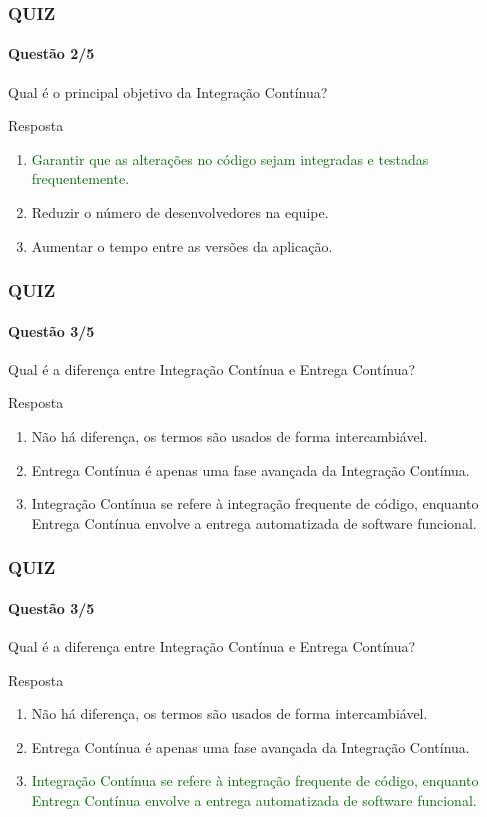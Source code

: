 \documentclass[
	9pt, %
	t, %
]{beamer}
\begin{document}
\begin{frame}
	\frametitle{QUIZ}
	\framesubtitle{Questão 2/5}

	{\Large Qual é o principal objetivo da Integração Contínua?}

	\begin{exampleblock}{Resposta}
		\begin{enumerate}[a]
			\item \textcolor{darkgreen}{Garantir que as alterações no código sejam integradas e testadas frequentemente.}
			\item Reduzir o número de desenvolvedores na equipe.
			\item Aumentar o tempo entre as versões da aplicação.
		\end{enumerate}
	\end{exampleblock}

\end{frame}

\begin{frame}
	\frametitle{QUIZ}
	\framesubtitle{Questão 3/5}

	{\Large Qual é a diferença entre Integração Contínua e Entrega Contínua? }

	\begin{exampleblock}{Resposta}
		\begin{enumerate}[a]
			\item Não há diferença, os termos são usados de forma intercambiável.
			\item Entrega Contínua é apenas uma fase avançada da Integração Contínua.
			\item Integração Contínua se refere à integração frequente de código, enquanto Entrega Contínua envolve a entrega automatizada de software funcional.
		\end{enumerate}
	\end{exampleblock}

\end{frame}

\begin{frame}
	\frametitle{QUIZ}
	\framesubtitle{Questão 3/5}

	{\Large Qual é a diferença entre Integração Contínua e Entrega Contínua? }

	\begin{exampleblock}{Resposta}
		\begin{enumerate}[a]
			\item Não há diferença, os termos são usados de forma intercambiável.
			\item Entrega Contínua é apenas uma fase avançada da Integração Contínua.
			\item \textcolor{darkgreen}{Integração Contínua se refere à integração frequente de código, enquanto Entrega Contínua envolve a entrega automatizada de software funcional.}
		\end{enumerate}
	\end{exampleblock}

\end{frame}
\end{document}
